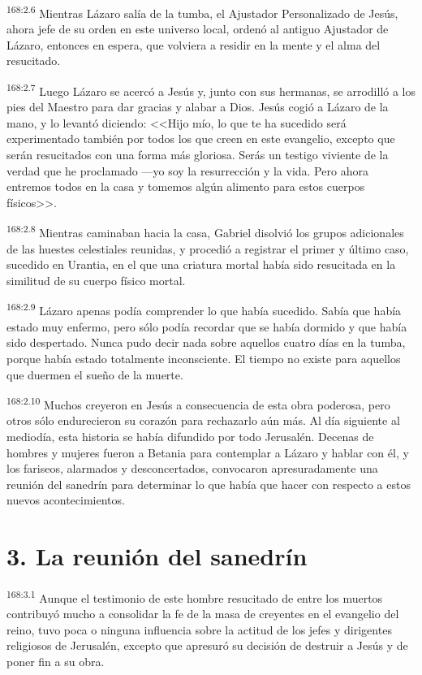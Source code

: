 \par 
\textsuperscript{168:2.6} Mientras Lázaro salía de la tumba, el Ajustador Personalizado de Jesús, ahora jefe de su orden en este universo local, ordenó al antiguo Ajustador de Lázaro, entonces en espera, que volviera a residir en la mente y el alma del resucitado.

\par 
\textsuperscript{168:2.7} Luego Lázaro se acercó a Jesús y, junto con sus hermanas, se arrodilló a los pies del Maestro para dar gracias y alabar a Dios. Jesús cogió a Lázaro de la mano, y lo levantó diciendo: <<Hijo mío, lo que te ha sucedido será experimentado también por todos los que creen en este evangelio, excepto que serán resucitados con una forma más gloriosa. Serás un testigo viviente de la verdad que he proclamado ---yo soy la resurrección y la vida. Pero ahora entremos todos en la casa y tomemos algún alimento para estos cuerpos físicos>>.

\par 
\textsuperscript{168:2.8} Mientras caminaban hacia la casa, Gabriel disolvió los grupos adicionales de las huestes celestiales reunidas, y procedió a registrar el primer y último caso, sucedido en Urantia, en el que una criatura mortal había sido resucitada en la similitud de su cuerpo físico mortal.

\par 
\textsuperscript{168:2.9} Lázaro apenas podía comprender lo que había sucedido. Sabía que había estado muy enfermo, pero sólo podía recordar que se había dormido y que había sido despertado. Nunca pudo decir nada sobre aquellos cuatro días en la tumba, porque había estado totalmente inconsciente. El tiempo no existe para aquellos que duermen el sueño de la muerte.

\par 
\textsuperscript{168:2.10} Muchos creyeron en Jesús a consecuencia de esta obra poderosa, pero otros sólo endurecieron su corazón para rechazarlo aún más. Al día siguiente al mediodía, esta historia se había difundido por todo Jerusalén. Decenas de hombres y mujeres fueron a Betania para contemplar a Lázaro y hablar con él, y los fariseos, alarmados y desconcertados, convocaron apresuradamente una reunión del sanedrín para determinar lo que había que hacer con respecto a estos nuevos acontecimientos.

\section*{3. La reunión del sanedrín}
\par 
\textsuperscript{168:3.1} Aunque el testimonio de este hombre resucitado de entre los muertos contribuyó mucho a consolidar la fe de la masa de creyentes en el evangelio del reino, tuvo poca o ninguna influencia sobre la actitud de los jefes y dirigentes religiosos de Jerusalén, excepto que apresuró su decisión de destruir a Jesús y de poner fin a su obra.

